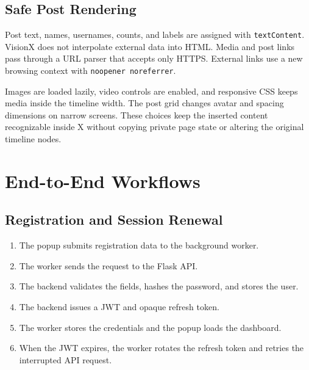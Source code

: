 \documentclass[11pt,a4paper]{report}
\newcommand{\code}[1]{\texttt{#1}}
\begin{document}
\section{Safe Post Rendering}
Post text, names, usernames, counts, and labels are assigned with
\code{textContent}. VisionX does not interpolate external data into HTML.
Media and post links pass through a URL parser that accepts only HTTPS.
External links use a new browsing context with \code{noopener noreferrer}.

Images are loaded lazily, video controls are enabled, and responsive CSS keeps
media inside the timeline width. The post grid changes avatar and spacing
dimensions on narrow screens. These choices keep the inserted content
recognizable inside X without copying private page state or altering the
original timeline nodes.

\chapter{End-to-End Workflows}

\section{Registration and Session Renewal}
\begin{enumerate}
  \item The popup submits registration data to the background worker.
  \item The worker sends the request to the Flask API.
  \item The backend validates the fields, hashes the password, and stores the
  user.
  \item The backend issues a JWT and opaque refresh token.
  \item The worker stores the credentials and the popup loads the dashboard.
  \item When the JWT expires, the worker rotates the refresh token and retries
  the interrupted API request.
\end{enumerate}
\end{document}
